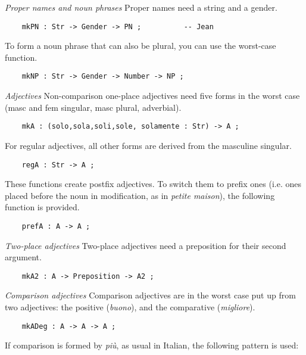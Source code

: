 \documentclass[11pt,a4paper]{article}
\newcommand{\subsubsubsection}[1]{\textit{#1}}
\begin{document}
\subsubsubsection{Proper names and noun phrases}
Proper names need a string and a gender.

\begin{verbatim}
    mkPN : Str -> Gender -> PN ;          -- Jean
\end{verbatim}

To form a noun phrase that can also be plural,
you can use the worst-case function.

\begin{verbatim}
    mkNP : Str -> Gender -> Number -> NP ; 
\end{verbatim}

\subsubsubsection{Adjectives}
Non-comparison one-place adjectives need five forms in the worst
case (masc and fem singular, masc plural, adverbial).

\begin{verbatim}
    mkA : (solo,sola,soli,sole, solamente : Str) -> A ;
\end{verbatim}

For regular adjectives, all other forms are derived from the
masculine singular. 

\begin{verbatim}
    regA : Str -> A ;
\end{verbatim}

These functions create postfix adjectives. To switch
them to prefix ones (i.e. ones placed before the noun in
modification, as in \textit{petite maison}), the following function is
provided.

\begin{verbatim}
    prefA : A -> A ;
\end{verbatim}

\subsubsubsection{Two-place adjectives}
Two-place adjectives need a preposition for their second argument.

\begin{verbatim}
    mkA2 : A -> Preposition -> A2 ;
\end{verbatim}

\subsubsubsection{Comparison adjectives}
Comparison adjectives are in the worst case put up from two
adjectives: the positive (\textit{buono}), and the comparative (\textit{migliore}). 

\begin{verbatim}
    mkADeg : A -> A -> A ;
\end{verbatim}

If comparison is formed by \textit{più}, as usual in Italian,
the following pattern is used:
\end{document}
